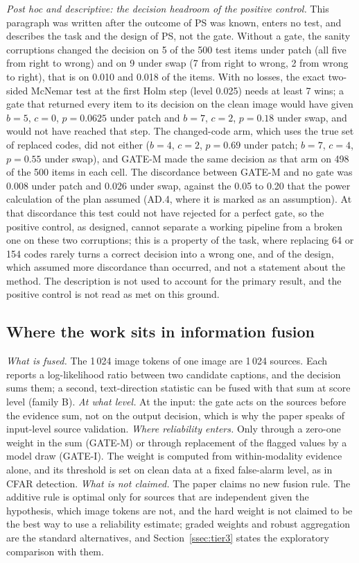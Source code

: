 \emph{Post hoc and descriptive: the decision headroom of the positive control.}
This paragraph was written after the outcome of PS was known, enters no test, and describes the task and the design of PS, not the
gate.
Without a gate, the sanity corruptions changed the decision on 5 of the 500 test items under patch (all five from right to wrong) and
on 9 under swap (7 from right to wrong, 2 from wrong to right), that is on 0.010 and 0.018 of the items.
With no losses, the exact two-sided McNemar test at the first Holm step (level 0.025) needs at least 7 wins; a gate that returned every
item to its decision on the clean image would have given $b=5$, $c=0$, $p=0.0625$ under patch and $b=7$, $c=2$, $p=0.18$ under swap,
and would not have reached that step.
The changed-code arm, which uses the true set of replaced codes, did not either ($b=4$, $c=2$, $p=0.69$ under patch; $b=7$, $c=4$,
$p=0.55$ under swap), and GATE-M made the same decision as that arm on 498 of the 500 items in each cell.
The discordance between GATE-M and no gate was 0.008 under patch and 0.026 under swap, against the 0.05 to 0.20 that the power
calculation of the plan assumed (AD.4, where it is marked as an assumption).
At that discordance this test could not have rejected for a perfect gate, so the positive control, as designed, cannot separate a
working pipeline from a broken one on these two corruptions; this is a property of the task, where replacing 64 or 154 codes rarely
turns a correct decision into a wrong one, and of the design, which assumed more discordance than occurred, and not a statement about
the method.
The description is not used to account for the primary result, and the positive control is not read as met on this ground.

\subsection{Where the work sits in information fusion}\label{ssec:disc_fit}
\emph{What is fused.}
The 1\,024 image tokens of one image are 1\,024 sources.
Each reports a log-likelihood ratio between two candidate captions, and the decision sums them; a second, text-direction statistic can
be fused with that sum at score level (family B).
\emph{At what level.}
At the input: the gate acts on the sources before the evidence sum, not on the output decision, which is why the paper speaks of
input-level source validation.
\emph{Where reliability enters.}
Only through a zero-one weight in the sum (GATE-M) or through replacement of the flagged values by a model draw (GATE-I).
The weight is computed from within-modality evidence alone, and its threshold is set on clean data at a fixed false-alarm level, as in
CFAR detection.
\emph{What is not claimed.}
The paper claims no new fusion rule.
The additive rule is optimal only for sources that are independent given the hypothesis, which image tokens are not, and the hard
weight is not claimed to be the best way to use a reliability estimate; graded weights and robust aggregation are the standard
alternatives, and Section~\ref{ssec:tier3} states the exploratory comparison with them.

